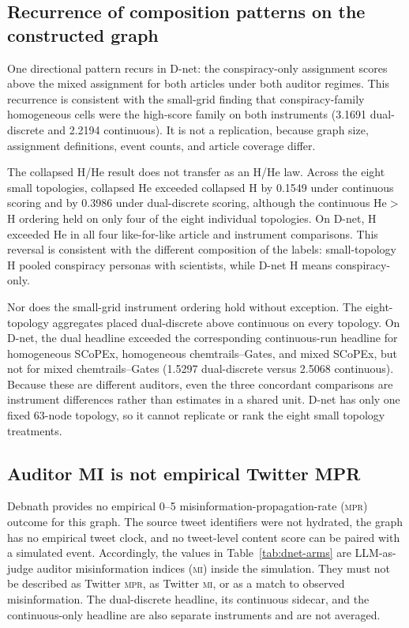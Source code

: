 \subsection{Recurrence of composition patterns on the constructed graph}

One directional pattern recurs in D-net: the conspiracy-only assignment
scores above the mixed assignment for both articles under both auditor
regimes. This recurrence is consistent with the small-grid finding that
conspiracy-family homogeneous cells were the high-score family on both
instruments (3.1691 dual-discrete and 2.2194 continuous). It is not a
replication, because graph size, assignment definitions, event counts, and
article coverage differ.

The collapsed H/He result does not transfer as an H/He law.  Across the
eight small topologies, collapsed He exceeded collapsed H by 0.1549 under
continuous scoring and by 0.3986 under dual-discrete scoring, although the
continuous He$>$H ordering held on only four of the eight individual
topologies.  On D-net, H exceeded He in all four like-for-like article and
instrument comparisons.  This reversal is consistent with the different
composition of the labels: small-topology H pooled conspiracy personas with
scientists, while D-net H means conspiracy-only.

Nor does the small-grid instrument ordering hold without exception.  The
eight-topology aggregates placed dual-discrete above continuous on every
topology.  On D-net, the dual headline exceeded the corresponding
continuous-run headline for homogeneous SCoPEx, homogeneous
chemtrails--Gates, and mixed SCoPEx, but not for mixed
chemtrails--Gates (1.5297 dual-discrete versus 2.5068 continuous).
Because these are different auditors, even the three concordant
comparisons are instrument differences rather than estimates in a shared
unit.  D-net has only one fixed 63-node topology, so it cannot replicate or
rank the eight small topology treatments.

\subsection{Auditor MI is not empirical Twitter MPR}

Debnath provides no empirical 0--5 misinformation-propagation-rate
(\textsc{mpr}) outcome for this graph.  The source tweet identifiers were
not hydrated, the graph has no empirical tweet clock, and no tweet-level
content score can be paired with a simulated event.  Accordingly, the
values in Table~\ref{tab:dnet-arms} are LLM-as-judge auditor misinformation
indices (\textsc{mi}) inside the simulation.  They must not be described as
Twitter \textsc{mpr}, as Twitter \textsc{mi}, or as a match to observed
misinformation.  The dual-discrete headline, its continuous sidecar, and
the continuous-only headline are also separate instruments and are not
averaged.

